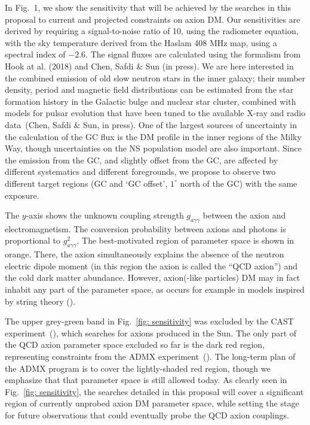\documentclass[a4paper, 11pt]{article}
\begin{document}
\medskip
 
In Fig.~1, we show the sensitivity that will be achieved by the searches in this proposal to current and projected constraints on axion DM. Our sensitivities are derived by requiring a signal-to-noise ratio of 10, using the radiometer equation, with the sky temperature derived from the Haslam 408 MHz map, using a spectral index of $-2.6$.  The signal fluxes are calculated using the formalism from Hook at al. (2018) and Chen, Safdi \& Sun (in press).  We are here interested in the combined emission of old slow neutron stars in the inner galaxy; their number density, period and magnetic field distributions can be estimated from the star formation history in the Galactic bulge and nuclear star cluster, combined with models for pulsar evolution that have been tuned to the available X-ray and radio data~(Chen, Safdi \& Sun, in press).  One of the largest sources of uncertainty in the calculation of the GC flux is the DM profile in the inner regions of the Milky Way, though uncertainties on the NS population model are also important.   Since the emission from the GC, and slightly offset from the GC, are affected by different systematics and different foregrounds, we propose to observe two different target regions (GC and `GC offset', $1^\circ$ north of the GC) with the same exposure.

The $y$-axis shows the unknown coupling strength $g_{a \gamma \gamma}$ between the axion and electromagnetism.  The conversion probability between axions and photons is proportional to $g_{a \gamma \gamma}^2$.  The best-motivated region of parameter space is shown in orange.  There, the axion simultaneously explains the absence of the neutron electric dipole moment (in this region the axion is called the ``QCD axion'') and the cold dark matter abundance.  However, axion(-like particles) DM may in fact inhabit any part of the parameter space, as occurs for example in models inspired by string theory (\cite{Svrcek:2006yi}).

The upper grey-green band in Fig.~\ref{fig: sensitivity} was excluded by the CAST experiment~(\cite{Arik:2015cjv}), which searches for axions produced in the Sun.  The only part of the QCD axion parameter space excluded so far is the dark red region, representing constraints from the ADMX experiment~(\cite{Du:2018uak}).  The long-term plan of the ADMX program is to cover the lightly-shaded red region, though we emphasize that that parameter space is still allowed today.  As clearly seen in Fig.~\ref{fig: sensitivity}, the searches detailed in this proposal will cover a significant region of currently unprobed axion DM parameter space, while setting the stage for future observations that could eventually probe the QCD axion couplings. 
\end{document}
